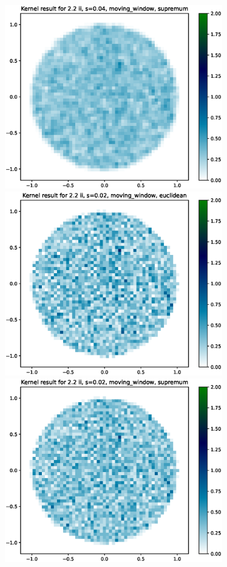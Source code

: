 \documentclass{article}
\begin{document}
\includegraphics[height=8cm]{comparisons//Kernel_result_2-2ii_s_0-04_moving_window_supremum.eps}\\
\hspace*{-1.5cm}\includegraphics[height=8cm]{comparisons//Kernel_result_2-2ii_s_0-02_moving_window_euclidean.eps} \hspace*{-1.5cm}
\includegraphics[height=8cm]{comparisons//Kernel_result_2-2ii_s_0-02_moving_window_supremum.eps}\vspace*{-1em} \\
\end{document}
